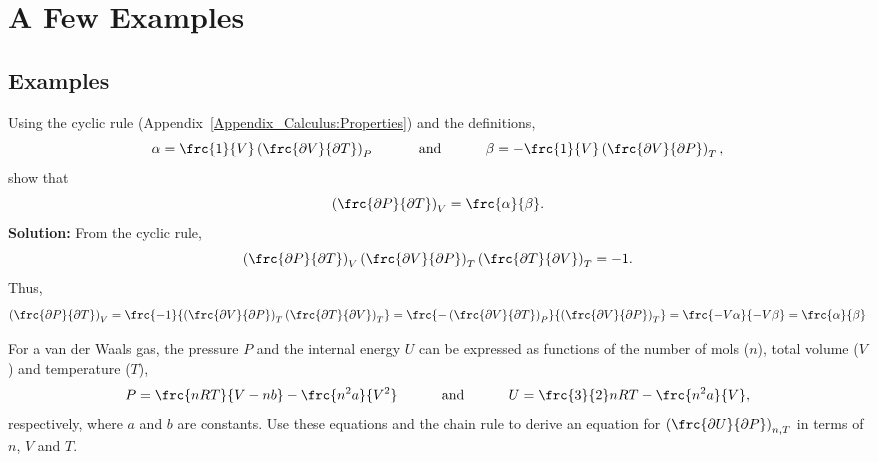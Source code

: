 
\chapter{A Few Examples}

\section{Examples}

  \begin{list}{\bf Example :~}{}
%
     \item\label{example1} Using the cyclic rule (Appendix~\ref{Appendix_Calculus:Properties}) and the definitions,
    \begin{displaymath}
        \alpha = \frc{1}{V}\left(\frc{\partial V}{\partial T}\right)_{P} \hspace{1cm}\text{ and }\hspace{1cm} \beta = -\frc{1}{V}\left(\frc{\partial V}{\partial P}\right)_{T},
    \end{displaymath}
    \noindent show that 
    \begin{displaymath}
      \left(\frc{\partial P}{\partial T}\right)_{V} = \frc{\alpha}{\beta}.
    \end{displaymath}
\medskip
     {\bf Solution:} From the cyclic rule,
       \begin{displaymath}
          \left(\frc{\partial P}{\partial T}\right)_{V}\left(\frc{\partial V}{\partial P}\right)_{T}\left(\frc{\partial T}{\partial V}\right)_{T} = -1.
       \end{displaymath}
     Thus,
       \begin{displaymath}
          \left(\frc{\partial P}{\partial T}\right)_{V} = \frc{-1}{\left(\frc{\partial V}{\partial P}\right)_{T}\left(\frc{\partial T}{\partial V}\right)_{T}} = \frc{-\left(\frc{\partial V}{\partial T}\right)_{P}}{\left(\frc{\partial V}{\partial P}\right)_{T}} = \frc{-V\alpha}{-V\beta} = \frc{\alpha}{\beta}
       \end{displaymath}
      
%
     \item\label{example2} For a van der Waals gas, the pressure $P$ and the internal energy $U$ can be expressed as functions of the number of mols ($n$), total volume ($V$) and temperature ($T$),
       \begin{displaymath}
         P = \frc{n R T}{V-nb} - \frc{n^{2}a}{V^{2}} \hspace{1cm}\text{ and }\hspace{1cm} U = \frc{3}{2}n R T - \frc{n^{2}a}{V},
       \end{displaymath}
       respectively, where $a$ and $b$ are constants. Use these equations and the chain rule to derive an equation for $\left(\frc{\partial U}{\partial P}\right)_{n,T}$ in terms of $n$, $V$ and $T$.


\end{list}
